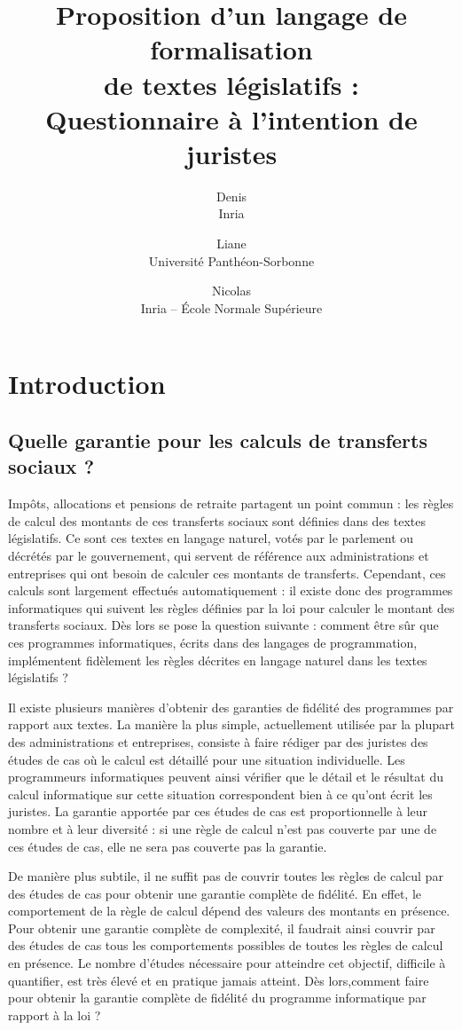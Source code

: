 \documentclass[12pt, french]{article}
\title{
  Proposition d'un langage de formalisation\\
  de textes législatifs :\\
  Questionnaire à l'intention de juristes
}
\author{
  Denis \bsc{Merigoux}\\Inria\and
  Liane \bsc{Huttner}\\Université Panthéon-Sorbonne\and
  Nicolas \bsc{Chataing}\\Inria -- École Normale Supérieure\and
}
\begin{document}
\maketitle

\renewcommand{\contentsname}{Sommaire}
\tableofcontents

\section{Introduction}

\subsection{Quelle garantie pour les calculs de transferts sociaux ?}

Impôts, allocations et pensions de retraite partagent un point commun : les règles de calcul des montants de ces transferts sociaux sont définies dans des textes législatifs. Ce sont ces textes en langage naturel, votés par le parlement ou décrétés par le gouvernement, qui servent de référence aux administrations et entreprises qui ont besoin de calculer ces montants de transferts. Cependant, ces calculs sont largement effectués automatiquement : il existe donc des programmes informatiques qui suivent les règles définies par la loi pour calculer le montant des transferts sociaux. Dès lors se pose la question suivante : comment être sûr que ces programmes informatiques, écrits dans des langages de programmation, implémentent fidèlement les règles décrites en langage naturel dans les textes législatifs ?

Il existe plusieurs manières d'obtenir des garanties de fidélité des programmes par rapport aux textes. La manière la plus simple, actuellement utilisée par la plupart des administrations et entreprises, consiste à faire rédiger par des juristes des études de cas où le calcul est détaillé pour une situation individuelle. Les programmeurs informatiques peuvent ainsi vérifier que le détail et le résultat du calcul informatique sur cette situation correspondent bien à ce qu'ont écrit les juristes. La garantie apportée par ces études de cas est proportionnelle à leur nombre et à leur diversité : si une règle de calcul n'est pas couverte par une de ces études de cas, elle ne sera pas couverte pas la garantie.

De manière plus subtile, il ne suffit pas de couvrir toutes les règles de calcul par des études de cas pour obtenir une garantie complète de fidélité. En effet, le comportement de la règle de calcul dépend des valeurs des montants en présence. Pour obtenir une garantie complète de complexité, il faudrait ainsi couvrir par des études de cas tous les comportements possibles de toutes les règles de calcul en présence. Le nombre d'études nécessaire pour atteindre cet objectif, difficile à quantifier, est très élevé et en pratique jamais atteint. Dès lors,comment faire pour obtenir la garantie complète de fidélité du programme informatique par rapport à la loi ?
\end{document}
